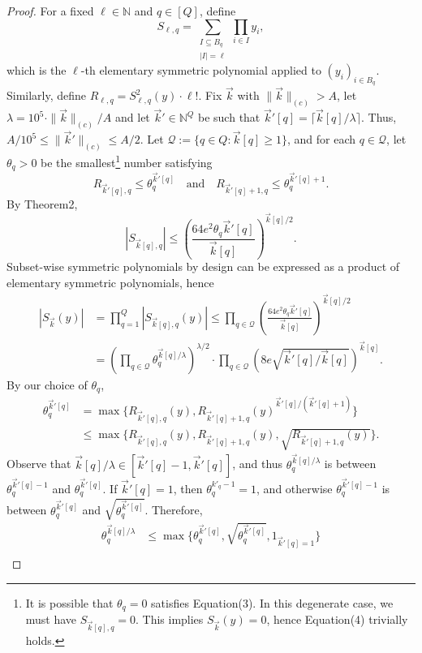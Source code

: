 \documentclass[10pt,a4paper]{article}
\begin{document}
\begin{proof}
For a fixed $\ell\in\mathbb N$ and $q\in[Q]$, define
\[
S_{\ell,q}=\sum_{\substack{I\subseteq B_q\\|I|=\ell}}\prod_{i\in I}y_i,
\]
which is the $\ell$-th elementary symmetric polynomial applied to $(y_i)_{i\in B_q}$. Similarly, define $R_{\ell,q}=S_{\ell,q}^2(y)\cdot\ell!$.
Fix $\vec k$ with $\|\vec k\|_{(c)}>A$, let $\lambda=10^5\cdot\|\vec k\|_{(c)}/A$ and let $\vec k'\in\mathbb N^Q$ be such that $\vec k'[q]=\lceil\vec k[q]/\lambda\rceil$. Thus, $A/10^5\le\|\vec k'\|_{(c)}\le A/2$. Let $\mathcal Q:=\{q\in Q:\vec k[q]\ge1\}$, and for each $q\in\mathcal Q$, let $\theta_q>0$ be the smallest\footnote{It is possible that $\theta_q=0$ satisfies Equation(3). In this degenerate case, we must have $S_{\vec k[q],q}=0$. This implies $S_{\vec k}(y)=0$, hence Equation(4) trivially holds.} number satisfying
\begin{equation}
R_{\vec k'[q],q}\le\theta_q^{\vec k'[q]}
\quad\text{and}\quad
R_{\vec k'[q]+1,q}\le\theta_q^{\vec k'[q]+1}.\tag{3}
\end{equation}
By Theorem2,
\[
|S_{\vec k[q],q}|\le\left(\frac{64e^2\theta_q\vec k'[q]}{\vec k[q]}\right)^{\vec k[q]/2}.
\]
Subset-wise symmetric polynomials by design can be expressed as a product of elementary symmetric polynomials, hence
\begin{align*}
|S_{\vec k}(y)|&=\prod_{q=1}^Q|S_{\vec k[q],q}(y)|
\le\prod_{q\in\mathcal Q}\left(\frac{64e^2\theta_q\vec k'[q]}{\vec k[q]}\right)^{\vec k[q]/2}\\
&=\left(\prod_{q\in\mathcal Q}\theta_q^{\vec k[q]/\lambda}\right)^{\lambda/2}
\cdot\prod_{q\in\mathcal Q}\left(8e\sqrt{\vec k'[q]/\vec k[q]}\right)^{\vec k[q]}.
\end{align*}
By our choice of $\theta_q$,
\begin{align*}
\theta_q^{\vec k'[q]}
&=\max\{R_{\vec k'[q],q}(y),R_{\vec k'[q]+1,q}(y)^{\vec k'[q]/(\vec k'[q]+1)}\}\\
&\le\max\{R_{\vec k'[q],q}(y),R_{\vec k'[q]+1,q}(y),\sqrt{R_{\vec k'[q]+1,q}(y)}\}.
\end{align*}
Observe that $\vec k[q]/\lambda\in[\vec k'[q]-1,\vec k'[q]]$, and thus $\theta_q^{\vec k[q]/\lambda}$ is between $\theta_q^{\vec k'[q]-1}$ and $\theta_q^{\vec k'[q]}$. If $\vec k'[q]=1$, then $\theta_q^{k'_q-1}=1$, and otherwise $\theta_q^{\vec k'[q]-1}$ is between $\theta_q^{\vec k'[q]}$ and $\sqrt{\theta_q^{\vec k'[q]}}$. Therefore,
\begin{align*}
\theta_q^{\vec k[q]/\lambda}
&\le\max\{\theta_q^{\vec k'[q]},\sqrt{\theta_q^{\vec k'[q]}},1_{\vec k'[q]=1}\}\\

\end{align*}
\end{proof}
\end{document}

